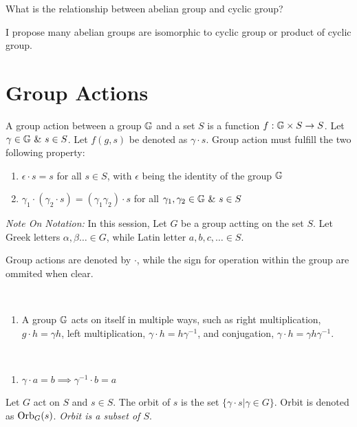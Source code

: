 \documentclass[../note.tex]{subfiles}
\begin{document}
\begin{hypothesis}
	What is the relationship between abelian group and cyclic group? 

	I propose many abelian groups are isomorphic to cyclic group or product of cyclic group.
\end{hypothesis}

\section{Group Actions}
\begin{definition}\label{def:group_action} \hypertarget{def:group_action}{}
	A group action between a group $\mathbb{G}$ and a set $S$ is a function $f: \mathbb{G}\times S \rightarrow S$. 
	Let $\gamma \in \mathbb{G} \ \&\ s \in S$. Let $f(g,s)$ be denoted as $\gamma\cdot s$. Group action must fulfill the two following property:
	\begin{enumerate}
		\item $\epsilon\cdot s=s$ for all $s\in S$, with $\epsilon$ being the identity of the group $\mathbb{G}$
		\item $\gamma_1\cdot(\gamma_2 \cdot s) = (\gamma_1 \gamma_2) \cdot s$ for all $\gamma_1, \gamma_2 \in \bb{G}\ \&\ s \in S$
	\end{enumerate}
\end{definition}

\emph{Note On Notation:}
In this session, Let $G$ be a group actting on the set $S$. Let Greek letters $\alpha, \beta \dots \in G$, while Latin letter $a,b,c, \dots \in S$. 

Group actions are denoted by $\cdot$, while the sign for operation within the group are ommited when clear.

\begin{example}
	\ 
\begin{enumerate}
	\item A group $\mathbb{G}$ acts on itself in multiple ways, such as right multiplication, $g\cdot h=\gamma h$, left multiplication, $\gamma\cdot h = h\gamma^{-1}$, and conjugation, $\gamma\cdot h = \gamma h\gamma^{-1}$.
\end{enumerate}
\end{example}
\begin{theorem}
	\ 
	\begin{enumerate}
		\item $\gamma \cdot a = b \implies \gamma^{-1} \cdot b = a$ 
	\end{enumerate}
\end{theorem}
\begin{definition}[Orbit] \label{def:orbit} \hypertarget{def:orbit_stabilizer}{}
	Let $G$ act on $S$ and $s \in S$. The orbit of $s$ is the set $\{\gamma\cdot s | \gamma \in G\}$. Orbit is denoted as $\text{Orb}_{G}({s})$.
	\emph{Orbit is a subset of $S$}.
\end{definition}
\end{document}
